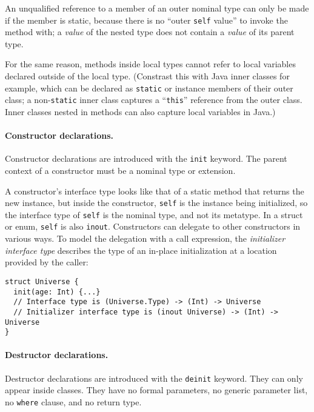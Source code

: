 \documentclass[../generics]{subfiles}
\begin{document}
An unqualified reference to a member of an outer nominal type can only be made if the member is static, because there is no ``outer \texttt{self} value'' to invoke the method with; a \emph{value} of the nested type does not contain a \emph{value} of its parent type.

For the same reason, methods inside local types cannot refer to local variables declared outside of the local type. (Constrast this with Java inner classes for example, which can be declared as \texttt{static} or instance members of their outer class; a non-\texttt{static} inner class captures a ``\texttt{this}'' reference from the outer class. Inner classes nested in methods can also capture local variables in Java.)

\paragraph{Constructor declarations.}
Constructor declarations are introduced with the \texttt{init} keyword. The parent context of a constructor must be a nominal type or extension.

A constructor's interface type looks like that of a static method that returns the new instance, but inside the constructor, \texttt{self} is the instance being initialized, so the interface type of \texttt{self} is the nominal type, and not its metatype. In a struct or enum, \texttt{self} is also \texttt{inout}. Constructors can delegate to other constructors in various ways. To model the delegation with a call expression, the \emph{initializer interface type} describes the type of an in-place initialization at a location provided by the caller:
\begin{Verbatim}
struct Universe {
  init(age: Int) {...}
  // Interface type is (Universe.Type) -> (Int) -> Universe
  // Initializer interface type is (inout Universe) -> (Int) -> Universe
}
\end{Verbatim}

\paragraph{Destructor declarations.}
Destructor declarations are introduced with the \texttt{deinit} keyword. They can only appear inside classes. They have no formal parameters, no generic parameter list, no \texttt{where} clause, and no return type.
\end{document}
